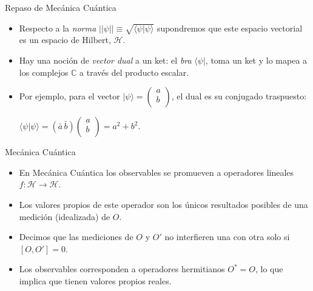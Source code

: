 \documentclass{beamer}
\begin{document}
\begin{frame}{Repaso de Mecánica Cuántica}
\begin{itemize}

\item Respecto a la \textit{norma} $\lvert \lvert \psi \rvert \rvert \equiv \sqrt{\langle \psi \lvert \psi \rangle}$ supondremos que este espacio vectorial es un espacio de Hilbert, $\mathcal{H}$.
\vspace{5mm}

\item Hay una noción de \textit{vector dual} a un ket: el \textit{bra} $\langle \psi \lvert$, toma un ket y lo mapea a los complejos $\mathbb{C}$ a través del producto escalar.
\vspace{5mm}
\item Por ejemplo, para el vector $ \lvert \psi \rangle = \begin{pmatrix}
a  \\
b  \\
\end{pmatrix}$, el dual es su conjugado traspuesto:


$ \langle \psi \lvert \psi \rangle = 
(\bar{a} \, \bar{b})
\begin{pmatrix}
a  \\
b  \\
\end{pmatrix} = a^2 + b^2.
$
\end{itemize}
\end{frame}


\begin{frame}{Mecánica Cuántica}

\begin{itemize}

\item En Mecánica Cuántica los observables se promueven a operadores lineales $f: \mathcal{H} \to \mathcal{H}$.
\vspace{5mm}
\item Los valores propios de este operador son los únicos resultados posibles de una medición (idealizada) de $O$.
\vspace{5mm}
\item Decimos que las mediciones de $O$ y $O'$ no interfieren una con otra solo si $[O,O' ] = 0$.
\vspace{5mm}
\item Los observables corresponden a operadores hermitianos $O^{*} = O$, lo que implica que tienen valores propios reales.

\end{itemize}
\end{frame}
\end{document}
